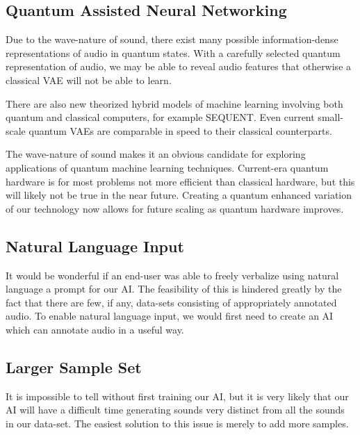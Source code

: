\documentclass{article}
\begin{document}
\subsection{Quantum Assisted Neural Networking}

Due to the wave-nature of sound, there exist many possible information-dense representations of audio in quantum states. \cite{Itaborai2022} With a carefully selected quantum representation of audio, we may be able to reveal audio features that otherwise a classical VAE will not be able to learn. \cite{Rocchetto2018} 

There are also new theorized hybrid models of machine learning involving both quantum and classical computers, for example SEQUENT. \cite{Altmann2023} Even current small-scale quantum VAEs are comparable in speed to their classical counterparts. \cite{Khoshaman2019}

The wave-nature of sound makes it an obvious candidate for exploring applications of quantum machine learning techniques. Current-era quantum hardware is for most problems not more efficient than classical hardware, but this will likely not be true in the near future. Creating a quantum enhanced variation of our technology now allows for future scaling as quantum hardware improves.

\subsection{Natural Language Input}

It would be wonderful if an end-user was able to freely verbalize using natural language a prompt for our AI. The feasibility of this is hindered greatly by the fact that there are few, if any, data-sets consisting of appropriately annotated audio. To enable natural language input, we would first need to create an AI which can annotate audio in a useful way.

\subsection{Larger Sample Set}

It is impossible to tell without first training our AI, but it is very likely that our AI will have a difficult time generating sounds very distinct from all the sounds in our data-set. The easiest solution to this issue is merely to add more samples.


\medskip



\printbibliography
\end{document}

